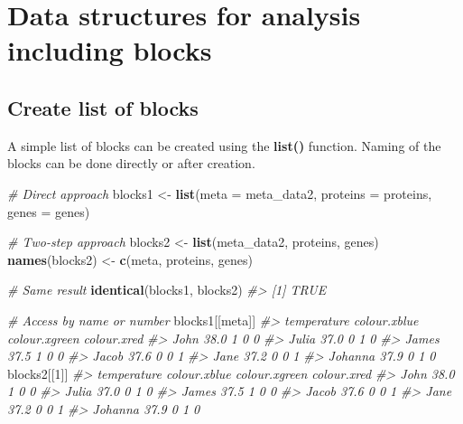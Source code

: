 \documentclass[
]{article}
\newenvironment{Shaded}{\begin{snugshade}}{\end{snugshade}}
\newcommand{\AttributeTok}[1]{\textcolor[rgb]{0.13,0.29,0.53}{#1}}
\newcommand{\CommentTok}[1]{\textcolor[rgb]{0.56,0.35,0.01}{\textit{#1}}}
\newcommand{\DecValTok}[1]{\textcolor[rgb]{0.00,0.00,0.81}{#1}}
\newcommand{\FunctionTok}[1]{\textcolor[rgb]{0.13,0.29,0.53}{\textbf{#1}}}
\newcommand{\NormalTok}[1]{#1}
\newcommand{\OtherTok}[1]{\textcolor[rgb]{0.56,0.35,0.01}{#1}}
\newcommand{\StringTok}[1]{\textcolor[rgb]{0.31,0.60,0.02}{#1}}
\begin{document}
\section{Data structures for analysis including
blocks}\label{data-structures-for-analysis-including-blocks}

\subsection{Create list of blocks}\label{create-list-of-blocks}

A simple list of blocks can be created using the \textbf{list()}
function. Naming of the blocks can be done directly or after creation.

\begin{Shaded}
\begin{Highlighting}[]
\CommentTok{\# Direct approach}
\NormalTok{blocks1 }\OtherTok{\textless{}{-}} \FunctionTok{list}\NormalTok{(}\AttributeTok{meta =}\NormalTok{ meta\_data2, }\AttributeTok{proteins =}\NormalTok{ proteins, }\AttributeTok{genes =}\NormalTok{ genes)}

\CommentTok{\# Two{-}step approach}
\NormalTok{blocks2 }\OtherTok{\textless{}{-}} \FunctionTok{list}\NormalTok{(meta\_data2, proteins, genes)}
\FunctionTok{names}\NormalTok{(blocks2) }\OtherTok{\textless{}{-}} \FunctionTok{c}\NormalTok{(}\StringTok{\textquotesingle{}meta\textquotesingle{}}\NormalTok{, }\StringTok{\textquotesingle{}proteins\textquotesingle{}}\NormalTok{, }\StringTok{\textquotesingle{}genes\textquotesingle{}}\NormalTok{)}

\CommentTok{\# Same result}
\FunctionTok{identical}\NormalTok{(blocks1, blocks2)}
\CommentTok{\#\textgreater{} [1] TRUE}

\CommentTok{\# Access by name or number}
\NormalTok{blocks1[[}\StringTok{\textquotesingle{}meta\textquotesingle{}}\NormalTok{]]}
\CommentTok{\#\textgreater{}         temperature colour.xblue colour.xgreen colour.xred}
\CommentTok{\#\textgreater{} John           38.0            1             0           0}
\CommentTok{\#\textgreater{} Julia          37.0            0             1           0}
\CommentTok{\#\textgreater{} James          37.5            1             0           0}
\CommentTok{\#\textgreater{} Jacob          37.6            0             0           1}
\CommentTok{\#\textgreater{} Jane           37.2            0             0           1}
\CommentTok{\#\textgreater{} Johanna        37.9            0             1           0}
\NormalTok{blocks2[[}\DecValTok{1}\NormalTok{]]}
\CommentTok{\#\textgreater{}         temperature colour.xblue colour.xgreen colour.xred}
\CommentTok{\#\textgreater{} John           38.0            1             0           0}
\CommentTok{\#\textgreater{} Julia          37.0            0             1           0}
\CommentTok{\#\textgreater{} James          37.5            1             0           0}
\CommentTok{\#\textgreater{} Jacob          37.6            0             0           1}
\CommentTok{\#\textgreater{} Jane           37.2            0             0           1}
\CommentTok{\#\textgreater{} Johanna        37.9            0             1           0}
\end{Highlighting}
\end{Shaded}
\end{document}
